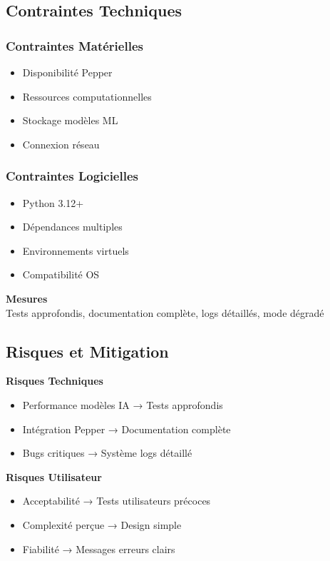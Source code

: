 \documentclass[12pt,a4paper]{article}
\newenvironment{block}[1]{\begin{center}\begin{minipage}{0.9\textwidth}\textbf{#1}\\}{\end{minipage}\end{center}}
\newenvironment{alertblock}[1]{\begin{center}\begin{minipage}{0.9\textwidth}\color{accentorange}\textbf{#1}\\}{\end{minipage}\end{center}}
\begin{document}
\subsection{Contraintes Techniques}

\subsubsection{Contraintes Matérielles}
\begin{itemize}
    \item Disponibilité Pepper
    \item Ressources computationnelles
    \item Stockage modèles ML
    \item Connexion réseau
\end{itemize}

\subsubsection{Contraintes Logicielles}
\begin{itemize}
    \item Python 3.12+
    \item Dépendances multiples
    \item Environnements virtuels
    \item Compatibilité OS
\end{itemize}

\begin{alertblock}{Mesures}
Tests approfondis, documentation complète, logs détaillés, mode dégradé
\end{alertblock}

\subsection{Risques et Mitigation}

\begin{block}{Risques Techniques}
\begin{itemize}
    \item Performance modèles IA → Tests approfondis
    \item Intégration Pepper → Documentation complète
    \item Bugs critiques → Système logs détaillé
\end{itemize}
\end{block}

\begin{block}{Risques Utilisateur}
\begin{itemize}
    \item Acceptabilité → Tests utilisateurs précoces
    \item Complexité perçue → Design simple
    \item Fiabilité → Messages erreurs clairs
\end{itemize}
\end{block}
\end{document}
